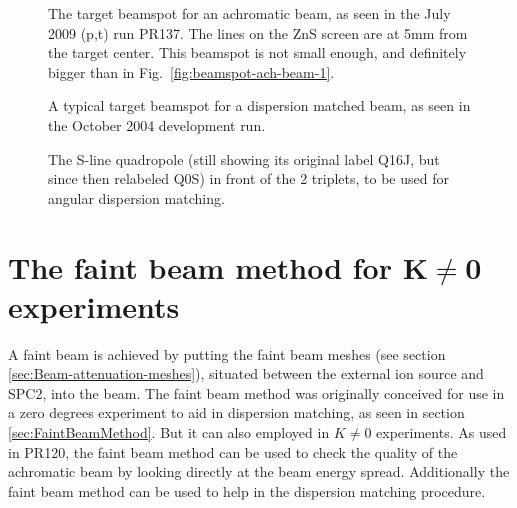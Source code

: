 \documentclass[11pt]{report}
\begin{document}
\begin{figure}[!ht]
\centerline{\vspace{0cm}\hspace{0cm}
}
\centering
\caption{The target beamspot for an achromatic beam, as seen in the July 2009 (p,t) run PR137. 
The lines on the ZnS screen are at 5mm from the target center.
This beamspot is not small enough, and definitely bigger than in Fig.~\ref{fig:beamspot-ach-beam-1}.}
\label{fig:beamspot-ach-beam-2}
\end{figure} 


\begin{figure}[!ht]
\centerline{\vspace{0cm}\hspace{0cm}
}
\centering
\caption{A typical target beamspot for a dispersion matched beam, as seen in the October 2004 development run.}
\label{fig:beamspot-dm-beam}
\end{figure} 


\begin{figure}[!ht]
\centerline{\vspace{0cm}\hspace{0cm}
}
\centering
\caption{The S-line quadropole (still showing its original label Q16J, but since then relabeled Q0S) 
in front of the 2 triplets, to be used for angular dispersion matching.}
\label{fig:quad-ang-disp-match}
\end{figure} 





\section{The faint beam method for K$\ne$0 experiments}\label{sec:FaintBeamMethodAchromatic}

A faint beam is achieved by putting 
the faint beam meshes (see section \ref{sec:Beam-attenuation-meshes}),
situated between the external ion source and SPC2, into the beam. The faint
beam method was originally conceived for use in a zero degrees experiment to aid in dispersion
matching, as seen in section \ref{sec:FaintBeamMethod}. 
But it can also employed in $K\neq0$ experiments.
As used in PR120, the faint beam method can be used to check the quality 
of the achromatic beam by looking directly at the beam energy spread.
Additionally the faint beam method can be used to help in the dispersion matching procedure.
\end{document}
